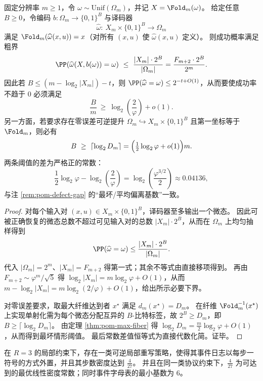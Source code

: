 \begin{theorem}\label{thm:fold-bbit-inversion-avg-worst-gap}
固定分辨率 \(m\ge 1\)，令 \(\omega\sim \mathrm{Unif}(\Omega_m)\)，并记 \(X=\Fold_m(\omega)\)。
给定任意 \(B\ge 0\)，令编码 \(b:\Omega_m\to\{0,1\}^B\) 与译码器
\[
\widehat\omega:\ X_m\times\{0,1\}^B\longrightarrow \Omega_m
\]
满足 \(\Fold_m(\widehat\omega(x,u))=x\)（对所有 \((x,u)\) 使 \(\widehat\omega(x,u)\) 定义）。
则成功概率满足粗界
\[
\PP(\widehat\omega(X,b(\omega))=\omega)\ \le\ \frac{|X_m|\cdot 2^B}{|\Omega_m|}
=\frac{F_{m+2}\cdot 2^B}{2^m}.
\]
因此若 \(B\le (m-\log_2|X_m|)-t\)，则 \(\PP(\widehat\omega=\omega)\le 2^{-t+O(1)}\)，从而要使成功率不趋于 \(0\) 必须满足
\[
\frac{B}{m}\ \ge\ \log_2\!\left(\frac{2}{\varphi}\right)+o(1).
\]
另一方面，若要求存在零误差可逆提升 \(\Omega_m\hookrightarrow X_m\times\{0,1\}^B\) 且第一坐标等于 \(\Fold_m\)，则必有
\[
B\ \ge\ \left\lceil\log_2 D_m\right\rceil
=\Bigl(\tfrac12\log_2\varphi+o(1)\Bigr)m.
\]
两条阈值的差为严格正的常数：
\[
\frac12\log_2\varphi-\log_2\!\left(\frac{2}{\varphi}\right)
=\log_2\!\left(\frac{\varphi^{3/2}}{2}\right)
\approx 0.04136,
\]
与注 \ref{rem:pom-defect-gap} 的“最坏/平均偏离基数”一致。
\end{theorem}
\begin{proof}
对每个输入对 \((x,u)\in X_m\times\{0,1\}^B\)，译码器至多输出一个微态。
因此可被正确恢复的微态总数不超过可见输入对的总数 \(|X_m|\cdot 2^B\)，从而在 \(\Omega_m\) 上均匀抽样得到
\[
\PP(\widehat\omega=\omega)\le \frac{|X_m|\cdot 2^B}{|\Omega_m|}.
\]
代入 \(|\Omega_m|=2^m\)、\(|X_m|=F_{m+2}\) 得第一式；其余不等式由直接移项得到。
再由 \(F_{m+2}\sim \varphi^m/\sqrt5\) 得 \(\log_2|X_m|=m\log_2\varphi+O(1)\)，从而 \(m-\log_2|X_m|=m\log_2(2/\varphi)+O(1)\)，给出所示必要下界。
\par
对零误差要求，取最大纤维达到者 \(x^\star\) 满足 \(d_m(x^\star)=D_m\)。
在纤维 \(\Fold_m^{-1}(x^\star)\) 上实现单射化需为每个微态分配互异的 \(B\)-比特标签，故 \(2^B\ge D_m\)，即 \(B\ge \lceil\log_2 D_m\rceil\)。
由定理 \ref{thm:pom-max-fiber} 得 \(\log_2 D_m=\frac{m}{2}\log_2\varphi+O(1)\)，从而得到最坏情形阈值。
最后常数差值恒等式为直接代数化简。证毕。
\end{proof}

\begin{conjecture}[三局部约束下的最小可逆事件字母表]\label{conj:fold-local-rewrite-minimal-reversible-event-alphabet}
在 \(R=3\) 的局部约束下，存在一类可逆局部重写策略，使得其事件日志以每步一符号的方式外置，并且其步数密度达到 \(\frac{4}{27}\)。
并且在同一类协议约束下，\(\frac{4}{27}\) 为可达到的最优线性密度常数；同时事件字母表的最小基数为 \(6\)。
\end{conjecture}

\endinput
